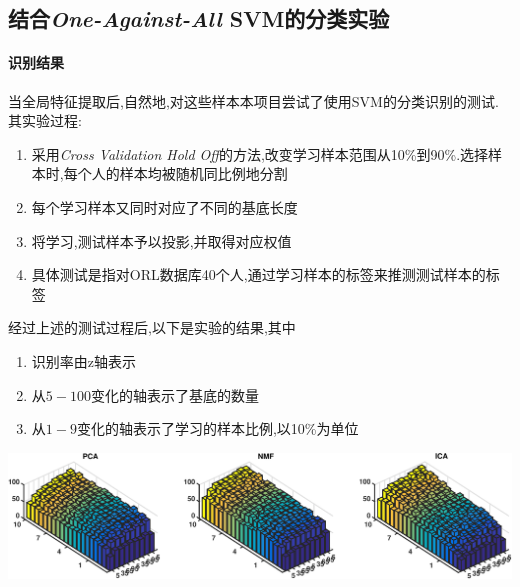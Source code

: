 \subsection{结合\textit{One-Against-All} SVM的分类实验}
\paragraph{识别结果} 当全局特征提取后,自然地,对这些样本本项目尝试了使用SVM的分类识别的测试.其实验过程:
	\begin{enumerate}
		\item 采用\textit{Cross Validation Hold Off}的方法,改变学习样本范围从10\%到90\%.选择样本时,每个人的样本均被随机同比例地分割
		\item 每个学习样本又同时对应了不同的基底长度
		\item 将学习,测试样本予以投影,并取得对应权值
		\item 具体测试是指对ORL数据库40个人,通过学习样本的标签来推测测试样本的标签
	\end{enumerate}
	
	
	经过上述的测试过程后,以下是实验的结果,其中
	\begin{enumerate}
		\item 识别率由z轴表示
		\item 从$5-100$变化的轴表示了基底的数量
		\item 从$1-9$变化的轴表示了学习的样本比例,以10\%为单位
	\end{enumerate}
	
	\begin{center}
	\begin{minipage}[t]{\linewidth}
	\center
	{
	\includegraphics[width=\textwidth]{Img/svm_pni} 
	}
	\end{minipage}
	\medskip
	\end{center}

